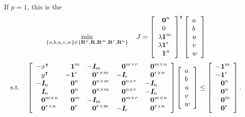 \documentclass{article}
\begin{document}
    If $p=1$, this is the \LP
    \begin{align*}
        \min_{\{a,b,u,v,w\}\in\{\textbf{R}^n,\textbf{R},\textbf{R}^m,\textbf{R}^r,\textbf{R}^n\}}  \quad J 
        & = \left[\begin{array}{lllllllllllllllllll}
            \phantom{\lambda}\textbf{0}^{n}\\
            \phantom{\lambda}0\\
            \lambda\textbf{1}^{m}\\
            \lambda\textbf{1}^{r}\\
            \phantom{\lambda}\textbf{1}^n
        \end{array}\right]^\intercal
        \left[\begin{array}{lllllllllllllllllll}
            a\\
            b\\
            u\\
            v\\
            w
        \end{array}\right]
    \end{align*}
    \begin{align*}
        \st\quad
        \mat{
                -x^\tp
            &
                \minus \ones^m
            &
                - \eye_m
            &   
                \minus \zeros^{m\times r}
            &
                \minus \zeros^{m\times n}
            \\
                \minus y^\tp
            &
                -\ones^r
            &
                \minus \zeros^{r\times m}
            &
                - \eye_r
            &
                \minus \zeros^{r\times n}
            \\
            -\eye_n & \minus \zeros^{n} & \minus \zeros^{n\times m} & \minus \zeros^{n\times r} & -\eye_n
            \\
            \minus \eye_n & \minus \zeros^n & \minus \zeros^{n\times m} &\minus \zeros^{n\times r} & -\eye_n
            \\
            \minus \zeros^{m\times n} & \minus \zeros^m & -\eye_m & \minus \zeros^{m\times r} & \minus \zeros^{m\times n}
            \\
            \minus \zeros^{r\times n} & \minus \zeros^r & \minus \zeros^{r\times m} & -\eye_r & \minus \zeros^{r\times n}
            }
        &\mat{a \\ b \\ u \\ v \\ w}
        \leq
        \mat{ -\ones^m \\ -\ones^r \\ \minus \zeros^n \\ \minus \zeros^n \\ \minus \zeros^m \\ \minus \zeros^r }.
    \end{align*}
\end{document}

